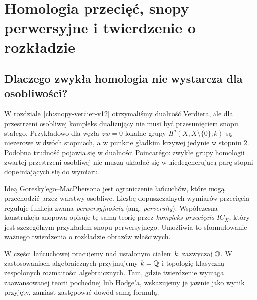 \chapter{Homologia przecięć, snopy perwersyjne i twierdzenie o rozkładzie}
\label{ch:ih-perverse-xiii}

\section{Dlaczego zwykła homologia nie wystarcza dla osobliwości?}
W rozdziale~\ref{ch:snopy-verdier-v12} otrzymaliśmy dualność Verdiera,
ale dla przestrzeni osobliwej kompleks dualizujący nie musi być
przesunięciem snopu stałego. Przykładowo dla węzła $zw=0$
lokalne grupy $H^q(X,X\setminus\{0\};k)$ są niezerowe w dwóch
stopniach, a w punkcie gładkim krzywej jedynie w stopniu $2$.
Podobna trudność pojawia się w dualności Poincarégo: zwykłe grupy
homologii zwartej przestrzeni osobliwej nie muszą układać się w
niedegenerującą parę stopni dopełniających się do wymiaru.

Ideą Goresky'ego--MacPhersona jest ograniczenie łańcuchów, które
mogą przechodzić przez warstwy osobliwe. Liczbę dopuszczalnych
wymiarów przecięcia reguluje funkcja zwana
\emph{perwersyjnością} (ang. \emph{perversity}).
Współczesna konstrukcja snopowa opisuje tę samą teorię przez
\emph{kompleks przecięcia} $IC_X$, który jest szczególnym
przykładem snopu perwersyjnego. Umożliwia to sformułowanie
ważnego twierdzenia o rozkładzie obrazów właściwych.

W części łańcuchowej pracujemy nad ustalonym ciałem $k$,
zazwyczaj $\mathbb{Q}$. W zastosowaniach algebraicznych
przyjmujemy $k=\mathbb{Q}$ i topologię klasyczną zespolonych
rozmaitości algebraicznych. Tam, gdzie twierdzenie wymaga
zaawansowanej teorii pochodnej lub Hodge'a, wskazujemy je
jawnie jako wynik przyjęty, zamiast zastępować dowód samą
formułą.


